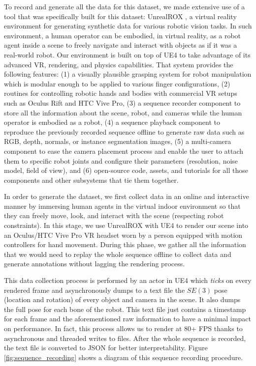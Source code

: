 To record and generate all the data for this dataset, we made extensive use of a tool that was specifically built for this dataset: UnrealROX \cite{Martinez-Gonzalez2018}, a virtual reality environment for generating synthetic data for various robotic vision tasks. In such environment, a human operator can be embodied, in virtual reality, as a robot agent inside a scene to freely navigate and interact with objects as if it was a real-world robot. Our environment is built on top of \ac{UE4} to take advantage of its advanced \ac{VR}, rendering, and physics capabilities. That system provides the following features: (1) a visually plausible grasping system for robot manipulation which is modular enough to be applied to various finger configurations, (2) routines for controlling robotic hands and bodies with commercial \ac{VR} setups such as Oculus  Rift and HTC Vive Pro, (3) a sequence recorder component to store all the information about the scene, robot, and cameras while the human operator is embodied as a robot, (4) a sequence playback component to reproduce the previously recorded sequence offline to generate raw data such as RGB, depth, normals,  or  instance  segmentation  images,  (5)  a  multi-camera  component  to  ease  the  camera  placement  process and  enable  the  user  to  attach  them  to  specific  robot  joints and  configure  their  parameters  (resolution,  noise  model, field of view), and (6) open-source code, assets, and tutorials for all those components and other subsystems that tie them together.

In order to generate the dataset, we first collect data in an online and interactive manner by immersing human agents in the virtual indoor environment so that they can freely move, look, and interact with the scene (respecting robot constraints). In this stage, we use UnrealROX with \ac{UE4} to render our scene into an Oculus/HTC Vive Pro \ac{VR} headset worn by a person equipped with motion controllers for hand movement. During this phase, we gather all the information that we would need to replay the whole sequence offline to collect data and generate annotations without lagging the rendering process.

This data collection process is performed by an actor in \ac{UE4} which \emph{ticks} on every rendered frame and asynchronously dumps to a text file the $SE(3)$ pose (location and rotation) of every object and camera in the scene. It also dumps the full pose for each bone of the robot. This text file just contains a timestamp for each frame and the aforementioned raw information to have a minimal impact on performance. In fact, this process allows us to render at 80+ \ac{FPS} thanks to asynchronous and threaded writes to files. After the whole sequence is recorded, the text file is converted to JSON for better interpretability. Figure \ref{fig:sequence_recording} shows a diagram of this sequence recording procedure.


